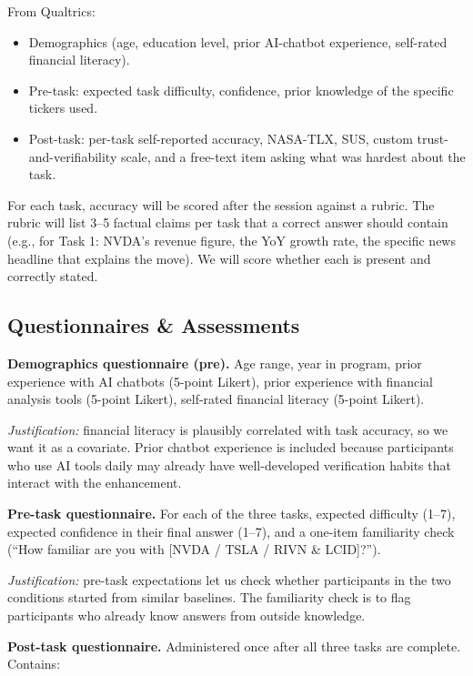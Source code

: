 From Qualtrics:

\begin{itemize}
    \item Demographics (age, education level, prior AI-chatbot experience, self-rated financial literacy).
    \item Pre-task: expected task difficulty, confidence, prior knowledge of the specific tickers used.
    \item Post-task: per-task self-reported accuracy, NASA-TLX, SUS, custom trust-and-verifiability scale, and a free-text item asking what was hardest about the task.
\end{itemize}

For each task, accuracy will be scored after the session against a rubric. The rubric will list 3--5 factual claims per task that a correct answer should contain (e.g., for Task 1: NVDA's revenue figure, the YoY growth rate, the specific news headline that explains the move). We will score whether each is present and correctly stated.

\subsection{Questionnaires \& Assessments}

\textbf{Demographics questionnaire (pre).} Age range, year in program, prior experience with AI chatbots (5-point Likert), prior experience with financial analysis tools (5-point Likert), self-rated financial literacy (5-point Likert).

\textit{Justification:} financial literacy is plausibly correlated with task accuracy, so we want it as a covariate. Prior chatbot experience is included because participants who use AI tools daily may already have well-developed verification habits that interact with the enhancement.

\textbf{Pre-task questionnaire.} For each of the three tasks, expected difficulty (1--7), expected confidence in their final answer (1--7), and a one-item familiarity check (``How familiar are you with [NVDA / TSLA / RIVN \& LCID]?'').

\textit{Justification:} pre-task expectations let us check whether participants in the two conditions started from similar baselines. The familiarity check is to flag participants who already know answers from outside knowledge.

\textbf{Post-task questionnaire.} Administered once after all three tasks are complete. Contains:


